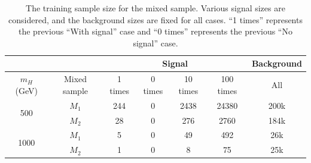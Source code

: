 \documentclass[12pt]{article}
\begin{document}
        \begin{table}[htpb]
            \centering
            \caption{The training sample size for the mixed sample. Various signal sizes are considered, and the background sizes are fixed for all cases. ``1 times'' represents the previous ``With signal'' case and ``0 times'' represents the previous ``No signal'' case.}
            \label{tab:training_sample_size_cwola_hunting_enlarge_signal_size}
            \begin{tabular}{c|c|cccc|c}
                                      &              & \multicolumn{4}{c|}{Signal}              & Background \\ \hline
                $m_H$ (GeV)           & Mixed sample & 1 times & 0 times & 10 times & 100 times & All        \\ \hline
                \multirow{2}{*}{500}  & $M_1$        & 244     & 0       & 2438     & 24380     & 200k       \\
                                      & $M_2$        & 28      & 0       & 276      & 2760      & 184k       \\ \hline
                \multirow{2}{*}{1000} & $M_1$        & 5       & 0       & 49       & 492       & 26k        \\
                                      & $M_2$        & 1       & 0       & 8        & 75        & 25k       
            \end{tabular}
        \end{table}
\end{document}
